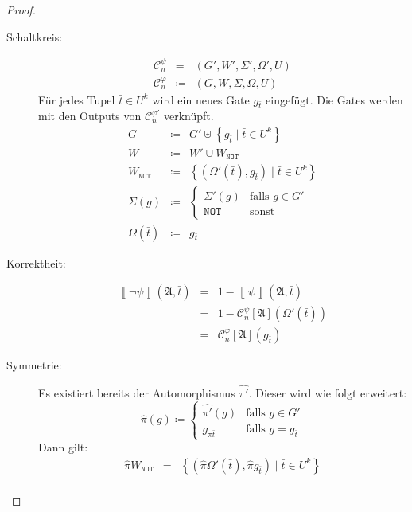 \begin{proof}
\begin{casenv}
\begin{description}
\item [{Schaltkreis:}] 
\begin{eqnarray*}
\mathcal{C}_{n}^{\psi} & = & \left(G',W',\Sigma',\Omega',U\right)\\
\mathcal{C}_{n}^{\varphi} & \coloneqq & \left(G,W,\Sigma,\Omega,U\right)
\end{eqnarray*}
Für jedes Tupel $\bar{t}\in U^{k}$ wird ein neues Gate $g_{\bar{t}}$
eingefügt. Die Gates werden mit den Outputs von $\mathcal{C}_{n}^{\varphi'}$
verknüpft. 
\begin{eqnarray*}
G & \coloneqq & G'\uplus\left\{ g_{\bar{t}}\mid\bar{t}\in U^{k}\right\} \\
W & \coloneqq & W'\cup W_{\mathtt{NOT}}\\
W_{\mathtt{NOT}} & \coloneqq & \left\{ \left(\Omega'\left(\bar{t}\right),g_{\bar{t}}\right)\mid\bar{t}\in U^{k}\right\} \\
\Sigma\left(g\right) & \coloneqq & \begin{cases}
\Sigma'\left(g\right) & \mathrm{falls}\,\,g\in G'\\
\mathtt{NOT} & \mathrm{sonst}
\end{cases}\\
\Omega\left(\bar{t}\right) & \coloneqq & g_{\bar{t}}
\end{eqnarray*}
\item [{Korrektheit:}] 
\begin{eqnarray*}
\left\llbracket \neg\psi\right\rrbracket \left(\mathfrak{A},\bar{t}\right) & = & 1-\left\llbracket \psi\right\rrbracket \left(\mathfrak{A},\bar{t}\right)\\
 & = & 1-\mathcal{C}_{n}^{\psi}\left[\mathfrak{A}\right]\left(\Omega'\left(\bar{t}\right)\right)\\
 & = & \mathcal{C}_{n}^{\varphi}\left[\mathfrak{A}\right]\left(g_{\bar{t}}\right)
\end{eqnarray*}
\item [{Symmetrie:}] Es existiert bereits der Automorphismus $\hat{\pi'}$.
Dieser wird wie folgt erweitert:
\[
\hat{\pi}\left(g\right)\coloneqq\begin{cases}
\hat{\pi'}\left(g\right) & \mathrm{falls}\,\,g\in G'\\
g_{\pi\bar{t}} & \mathrm{falls}\,\,g=g_{\bar{t}}
\end{cases}
\]
Dann gilt:
\begin{eqnarray*}
\hat{\pi}W_{\mathtt{NOT}} & = & \left\{ \left(\hat{\pi}\Omega'\left(\bar{t}\right),\hat{\pi}g_{\bar{t}}\right)\mid\bar{t}\in U^{k}\right\} \\

\end{eqnarray*}
\end{description}
\end{casenv}
\end{proof}
